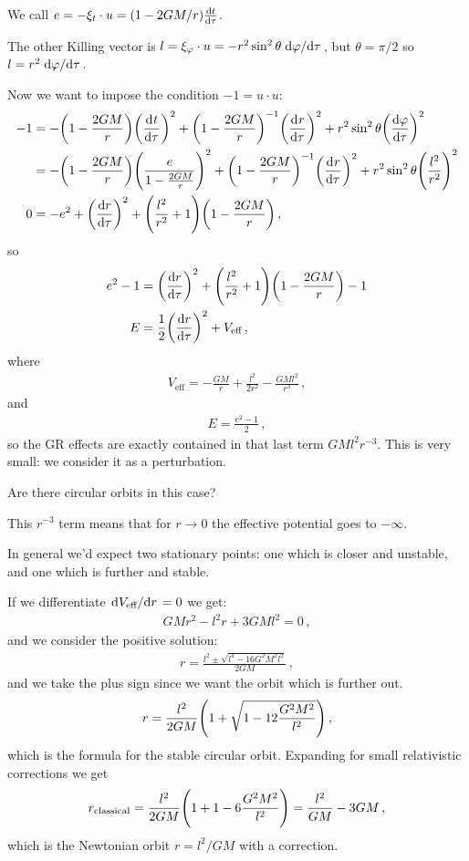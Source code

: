 \documentclass[main.tex]{subfiles}
\begin{document}
We call \(e = - \xi_t \cdot u = (1 - 2GM/r) \dv{t}{\tau }\).

The other Killing vector is \(l = \xi_\varphi \cdot u  = - r^2 \sin^2 \theta \dv*{\varphi }{\tau }\), but \(\theta = \pi /2\) so \(l = r^2 \dv*{\varphi }{\tau }\). 

Now we want to impose the condition \(-1 = u \cdot u\): 
%
\begin{align}
  -1 &=
  - \qty(1 - \frac{2GM}{r}) \qty(\dv[]{t}{\tau })^2
  + \qty(1 - \frac{2GM}{r})^{-1} \qty(\dv[]{r}{\tau })^2
  + r^2 \sin^2 \theta \qty(\dv{\varphi }{\tau })^2  \\
  &=
  - \qty(1 - \frac{2GM}{r}) \qty(\frac{e}{1 - \frac{2GM}{r}})^2
  + \qty(1 - \frac{2GM}{r})^{-1} \qty(\dv[]{r}{\tau })^2
  + r^2 \sin^2 \theta \qty(\frac{l^2}{r^2})^2  \\
  0&= - e^2 + \qty(\dv{r}{\tau })^2
  + \qty(\frac{l^2}{r^2}+1) \qty(1 - \frac{2GM}{r})
\,,
\end{align}
%
so 
%
\begin{align}
  e^2-1 &= \qty(\dv{r}{\tau })^2 + \qty(\frac{l^2}{r^2} +1)
  \qty(1 - \frac{2GM}{r}) - 1 \\
  E &=  \frac{1}{2} \qty(\dv{r}{\tau })^2
  + V _{\text{eff}}
\,,
\end{align}
%
where 
%
\begin{align}
  V_{\text{eff}} = - \frac{GM}{r} + \frac{l^2}{2 r^2} - \frac{GMl^2}{r^3}
\,,
\end{align}
%
and 
%
\begin{align}
  E = \frac{e^2-1}{2}
\,,
\end{align}
%
so the GR effects are exactly contained in that last term \(GMl^2r^{-3}\). This is very small: we consider it as a perturbation.

Are there circular orbits in this case? 

This \(r^{-3}\) term means that for \(r \rightarrow 0\) the effective potential goes to \(- \infty\).

In general we'd expect two stationary points: one which is closer and unstable, and one which is further and stable.

If we differentiate \(\dv*{V _{\text{eff}}}{r}= 0\) we get: 
%
\begin{align}
  GM r^2 - l^2 r + 3GM l^2 = 0
\,,
\end{align}
%
and we consider the positive solution: 
%
\begin{align}
  r= \frac{l^2 \pm \sqrt{l^4 - 16 G^2M^2l^2}}{2GM}
\,,
\end{align}
%
and we take the plus sign since we want the orbit which is further out. 
%
\begin{align}
  r = \frac{l^2}{2GM} \qty(1 + \sqrt{1 - 12 \frac{G^2M^2}{l^2}})
\,,
\end{align}
%
which is the formula for the stable circular orbit.
Expanding for small relativistic corrections we get 
%
\begin{align}
  r _{\text{classical}} = \frac{l^2}{2GM} \qty(1+1-6 \frac{G^2M^2}{l^2}) = \frac{l^2}{GM} - 3GM
\,,
\end{align}
%
which is the Newtonian orbit \(r = l^2/GM\) with a correction.
\end{document}
